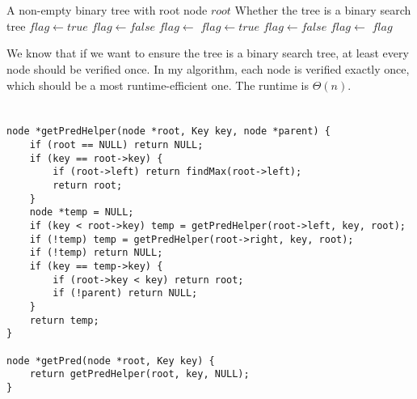 \documentclass{article}
\begin{document}
\section{}
\begin{algorithm}[H]
    \begin{algorithmic}
        \Require A non-empty binary tree with root node $root$
        \Ensure Whether the tree is a binary search tree
                \State $flag\gets true$
                \State $flag\gets false$
            \Else
                \State $flag\gets$ 
            \EndIf
                \State {}
            \EndIf
                \State $flag\gets true$
                \State $flag\gets false$
            \Else
                \State $flag\gets$ 
            \EndIf
            \State \Return $flag$
        \EndFunction
    \end{algorithmic}  
\end{algorithm}

We know that if we want to ensure the tree is a binary search tree, at least every node should be verified once. In my algorithm, each node is verified exactly once, which should be a most runtime-efficient one. The runtime is $\Theta(n)$.

\section{}
\begin{verbatim}
node *getPredHelper(node *root, Key key, node *parent) {
    if (root == NULL) return NULL;
    if (key == root->key) {
        if (root->left) return findMax(root->left);
        return root;
    }
    node *temp = NULL;
    if (key < root->key) temp = getPredHelper(root->left, key, root);
    if (!temp) temp = getPredHelper(root->right, key, root);
    if (!temp) return NULL;
    if (key == temp->key) {
        if (root->key < key) return root;
        if (!parent) return NULL;
    }
    return temp;
}

node *getPred(node *root, Key key) {
    return getPredHelper(root, key, NULL);
}
\end{verbatim}
\end{document}

